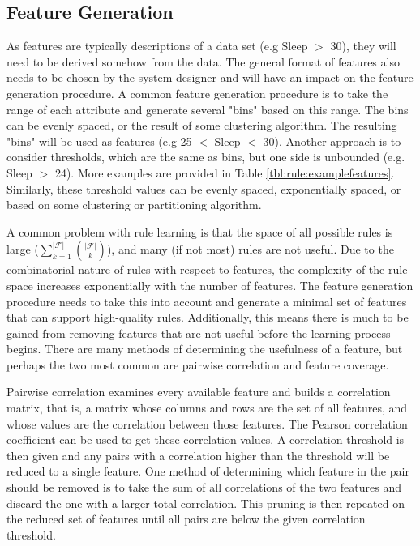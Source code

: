 \subsection{Feature Generation} \label{chap:rule:pre}

As features are typically descriptions of a data set (e.g Sleep $>$ 30), they will need to be derived somehow from the data. The general format of features also needs to be chosen by the system designer and will have an impact on the feature generation procedure. A common feature generation procedure is to take the range of each attribute and generate several "bins" based on this range. The bins can be evenly spaced, or the result of some clustering algorithm. The resulting "bins" will be used as features (e.g 25 $<$ Sleep $<$ 30). Another approach is to consider thresholds, which are the same as bins, but one side is unbounded (e.g. Sleep $>$ 24). More examples are provided in Table \ref{tbl:rule:examplefeatures}. Similarly, these threshold values can be evenly spaced, exponentially spaced, or based on some clustering or partitioning algorithm. 

A common problem with rule learning is that the space of all possible rules is large ($\sum_{k=1}^{|\mathcal{F}|} {|\mathcal{F}| \choose k}$), and many (if not most) rules are not useful. Due to the combinatorial nature of rules with respect to features, the complexity of the rule space increases exponentially with the number of features. The feature generation procedure needs to take this into account and generate a minimal set of features that can support high-quality rules. Additionally, this means there is much to be gained from removing features that are not useful before the learning process begins. There are many methods of determining the usefulness of a feature, but perhaps the two most common are pairwise correlation and feature coverage.

Pairwise correlation examines every available feature and builds a correlation matrix, that is, a matrix whose columns and rows are the set of all features, and whose values are the correlation between those features. The Pearson correlation coefficient \cite{benesty2009pearson} can be used to get these correlation values. A correlation threshold is then given and any pairs with a correlation higher than the threshold will be reduced to a single feature. One method of determining which feature in the pair should be removed is to take the sum of all correlations of the two features and discard the one with a larger total correlation. This pruning is then repeated on the reduced set of features until all pairs are below the given correlation threshold.

